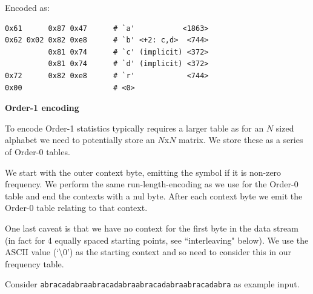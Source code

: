 \documentclass[a4paper]{article}
\begin{document}
Encoded as:
\begin{verbatim}
0x61      0x87 0x47      # `a'           <1863>
0x62 0x02 0x82 0xe8      # `b' <+2: c,d>  <744>
          0x81 0x74      # `c' (implicit) <372> 
          0x81 0x74      # `d' (implicit) <372> 
0x72      0x82 0xe8      # `r'            <744> 
0x00                     # <0>          
\end{verbatim}


\textbf{Order-1 encoding}

To encode Order-1 statistics typically requires a larger table as for
an $N$ sized alphabet we need to potentially store an $N$x$N$ matrix.
We store these as a series of Order-0 tables.

We start with the outer context byte, emitting the symbol if it is
non-zero frequency.  We perform the same run-length-encoding as we
use for the Order-0 table and end the contexts with a nul byte.  After
each context byte we emit the Order-0 table relating to that context.

One last caveat is that we have no context for the first byte in the
data stream (in fact for 4 equally spaced starting points, see
``interleaving" below).  We use the ASCII value (`\textbackslash0') as
the starting context and so need to consider this in our frequency
table.

Consider \texttt{abracadabraabracadabraabracadabraabracadabra} as
example input.
\end{document}
